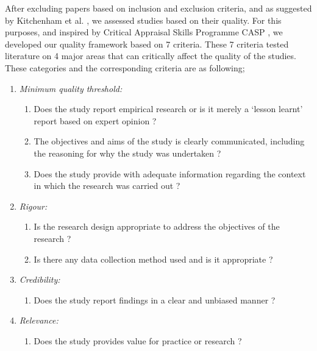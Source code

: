 \documentclass{bmcart}
\begin{document}
After excluding papers based on inclusion and exclusion criteria, and as suggested by Kitchenham et al. \cite{kitchenham2015evidence}, we assessed studies based on their quality. For this purposes, and inspired by Critical Appraisal Skills Programme CASP \cite{CASP}, we developed our quality framework based on 7 criteria. These 7 criteria tested literature on 4 major areas that can critically affect the quality of the studies. These categories and the corresponding criteria are as following;

\begin{enumerate}
    \item \emph{Minimum quality threshold:} 
    \begin{enumerate}
        \item Does the study report empirical research or is it merely a `lesson learnt' report based on expert opinion ?
        \item The objectives and aims of the study is clearly communicated, including the reasoning for why the study was undertaken ? 
        \item Does the study provide with adequate information regarding the context in which the research was carried out ?
    \end{enumerate}
    \item \emph{Rigour:}
    \begin{enumerate}
        \item Is the research design appropriate to address the objectives of the research ?
        \item Is there any data collection method used and is it appropriate ?
    \end{enumerate}
    \item \emph{Credibility:}
      \begin{enumerate}
        \item Does the study report findings in a clear and unbiased manner ? 
     \end{enumerate}
    \item \emph{Relevance:}
    \begin{enumerate}
        \item Does the study provides value for practice or research ?
     \end{enumerate}
\end{enumerate}
\end{document}
